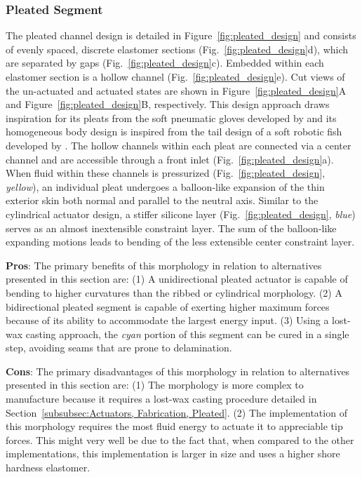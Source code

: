 \subsubsection{Pleated Segment}
\label{subsubsec:Actuators, Actuator Morphologies, Pleated}
The pleated channel design is detailed in Figure~\ref{fig:pleated_design} and consists of evenly spaced, discrete elastomer sections (Fig.~\ref{fig:pleated_design}d), which are separated by gaps (Fig.~\ref{fig:pleated_design}c).
%
Embedded within each elastomer section is a hollow channel (Fig.~\ref{fig:pleated_design}e).
%
Cut views of the un-actuated and actuated states are shown in Figure~\ref{fig:pleated_design}A and Figure~\ref{fig:pleated_design}B, respectively.
%
This design approach draws inspiration for its pleats from the soft pneumatic gloves developed by \citet{polygerinos2013towards} and its homogeneous body design is inspired from the tail design of a soft robotic fish developed by \citet{katzschmann2014hydraulic}.
%
The hollow channels within each pleat are connected via a center channel and are accessible through a front inlet (Fig.~\ref{fig:pleated_design}a).
%
When fluid within these channels is pressurized (Fig.~\ref{fig:pleated_design}, \emph{yellow}), an individual pleat undergoes a balloon-like expansion of the thin exterior skin both normal and parallel to the neutral axis.
%
Similar to the cylindrical actuator design, a stiffer silicone layer (Fig.~\ref{fig:pleated_design}, \emph{blue}) serves as an almost inextensible constraint layer.
%
The sum of the balloon-like expanding motions leads to bending of the less extensible center constraint layer.

\textbf{Pros}: The primary benefits of this morphology in relation to alternatives presented in this section are: (1) A unidirectional pleated actuator is capable of bending to higher curvatures than the ribbed or cylindrical morphology.
(2) A bidirectional pleated segment is capable of exerting higher maximum forces because of its ability to accommodate the largest energy input.
(3) Using a lost-wax casting approach, the \emph{cyan} portion of this segment can be cured in a single step, avoiding seams that are prone to delamination.

\textbf{Cons}: The primary disadvantages of this morphology in relation to alternatives presented in this section are: (1) The morphology is more complex to manufacture because it requires a lost-wax casting procedure detailed in Section~\ref{subsubsec:Actuators, Fabrication, Pleated}. (2) The implementation of this morphology requires the most fluid energy to actuate it to appreciable tip forces. This might very well be due to the fact that, when compared to the other implementations, this implementation is larger in size and uses a higher shore hardness elastomer.

